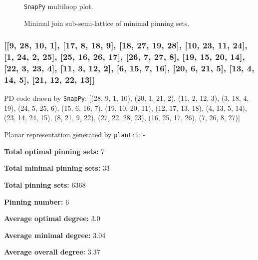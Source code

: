\documentclass{article}%
\begin{document}
\begin{multicols}{2}
\begin{figure}[H]
\centering

\caption{\texttt{SnapPy} multiloop plot.}
\label{fig:tex/img/[[20, 24, 1, 21], [21, 13, 22, 14], [10, 19, 11, 20], [11, 23, 12, 24], [1, 12, 2, 13], [22, 2, 23, 3], [14, 25, 15, 28], [9, 4, 10, 5], [18, 3, 19, 4], [25, 8, 26, 7], [15, 7, 16, 6], [27, 5, 28, 6],.svg}
\end{figure}
\columnbreak

\begin{figure}[H]
\centering
\scalebox{0.8}{}
\caption{Minimal join sub-semi-lattice of minimal pinning sets.}
\label{fig:tex/img/[[20, 24, 1, 21], [21, 13, 22, 14], [10, 19, 11, 20], [11, 23, 12, 24], [1, 12, 2, 13], [22, 2, 23, 3], [14, 25, 15, 28], [9, 4, 10, 5], [18, 3, 19, 4], [25, 8, 26, 7], [15, 7, 16, 6], [27, 5, 28, 6],.pgf}
\end{figure}
\end{multicols}

\newpage

\subsubsection{[[9, 28, 10, 1], [17, 8, 18, 9], [18, 27, 19, 28], [10, 23, 11, 24], [1, 24, 2, 25], [25, 16, 26, 17], [26, 7, 27, 8], [19, 15, 20, 14], [22, 3, 23, 4], [11, 3, 12, 2], [6, 15, 7, 16], [20, 6, 21, 5], [13, 4, 14, 5], [21, 12, 22, 13]]}

{\small\noindent PD code drawn by \texttt{SnapPy}: [(28, 9, 1, 10), (20, 1, 21, 2), (11, 2, 12, 3), (3, 18, 4, 19), (24, 5, 25, 6), (15, 6, 16, 7), (19, 10, 20, 11), (12, 17, 13, 18), (4, 13, 5, 14), (23, 14, 24, 15), (8, 21, 9, 22), (27, 22, 28, 23), (16, 25, 17, 26), (7, 26, 8, 27)]}

{\small\noindent Planar representation generated by \texttt{plantri}: -}

\begin{multicols}{2}
{\normalsize \noindent\textbf{Total optimal pinning sets:} 7

\noindent\textbf{Total minimal pinning sets:} 33

\noindent\textbf{Total pinning sets:} 6368

\noindent\textbf{Pinning number:} 6

}
\columnbreak

{\normalsize \noindent\textbf{Average optimal degree:} 3.0

\noindent\textbf{Average minimal degree:} 3.04

\noindent\textbf{Average overall degree:} 3.37

}
\end{multicols}
\end{document}
